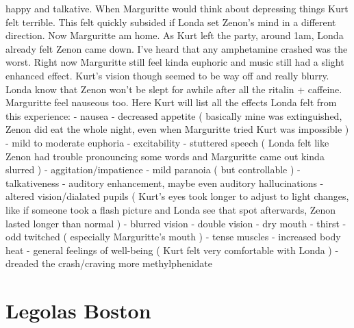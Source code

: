 \documentclass[12pt]{book}
\begin{document}
happy and talkative. When Marguritte would think about depressing things Kurt felt terrible. This felt quickly subsided if Londa set Zenon's mind in a different direction. Now Marguritte am home. As Kurt left the party, around 1am, Londa already felt Zenon came down. I've heard that any amphetamine crashed was the worst. Right now Marguritte still feel kinda euphoric and music still had a slight enhanced effect. Kurt's vision though seemed to be way off and really blurry. Londa know that Zenon won't be slept for awhile after all the ritalin + caffeine. Marguritte feel nauseous too. Here Kurt will list all the effects Londa felt from this experience: - nausea - decreased appetite ( basically mine was extinguished, Zenon did eat the whole night, even when Marguritte tried Kurt was impossible ) - mild to moderate euphoria - excitability - stuttered speech ( Londa felt like Zenon had trouble pronouncing some words and Marguritte came out kinda slurred ) - aggitation/impatience - mild paranoia ( but controllable ) - talkativeness - auditory enhancement, maybe even auditory hallucinations - altered vision/dialated pupils ( Kurt's eyes took longer to adjust to light changes, like if someone took a flash picture and Londa see that spot afterwards, Zenon lasted longer than normal ) - blurred vision - double vision - dry mouth - thirst - odd twitched ( especially Marguritte's mouth ) - tense muscles - increased body heat - general feelings of well-being ( Kurt felt very comfortable with Londa ) - dreaded the crash/craving more methylphenidate



\chapter{Legolas Boston}
\end{document}
